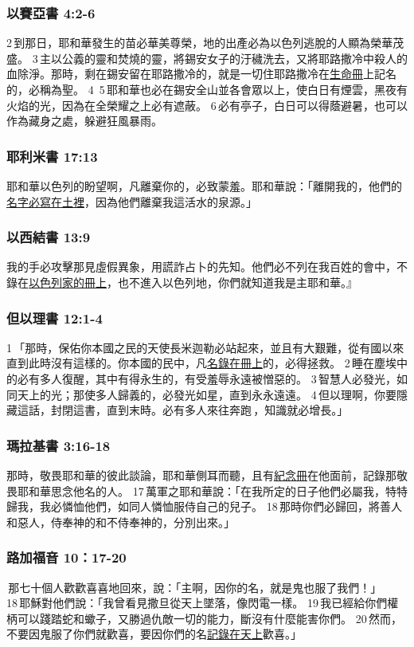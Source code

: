 \subsubsection{以賽亞書 4:2-6}
2 到那日，耶和華發生的苗必華美尊榮，地的出產必為以色列逃脫的人顯為榮華茂盛。 3 主以公義的靈和焚燒的靈，將錫安女子的汙穢洗去，又將耶路撒冷中殺人的血除淨。那時，剩在錫安留在耶路撒冷的，就是一切住耶路撒冷在\underline{生命冊}上記名的，必稱為聖。 4  5 耶和華也必在錫安全山並各會眾以上，使白日有煙雲，黑夜有火焰的光，因為在全榮耀之上必有遮蔽。 6 必有亭子，白日可以得蔭避暑，也可以作為藏身之處，躲避狂風暴雨。


\subsubsection{耶利米書 17:13}
耶和華以色列的盼望啊，凡離棄你的，必致蒙羞。耶和華說：「離開我的，他們的\underline{名字必寫在土裡}，因為他們離棄我這活水的泉源。」

\subsubsection{以西結書 13:9}
我的手必攻擊那見虛假異象，用謊詐占卜的先知。他們必不列在我百姓的會中，不錄在\underline{以色列家的冊上}，也不進入以色列地，你們就知道我是主耶和華。』



\subsubsection{但以理書 12:1-4}
1 「那時，保佑你本國之民的天使長米迦勒必站起來，並且有大艱難，從有國以來直到此時沒有這樣的。你本國的民中，凡\underline{名錄在冊上}的，必得拯救。 2 睡在塵埃中的必有多人復醒，其中有得永生的，有受羞辱永遠被憎惡的。 3 智慧人必發光，如同天上的光；那使多人歸義的，必發光如星，直到永永遠遠。 4 但以理啊，你要隱藏這話，封閉這書，直到末時。必有多人來往奔跑 ，知識就必增長。」

\subsubsection{瑪拉基書 3:16-18}
那時，敬畏耶和華的彼此談論，耶和華側耳而聽，且有\underline{紀念冊}在他面前，記錄那敬畏耶和華思念他名的人。 17 萬軍之耶和華說：「在我所定的日子他們必屬我，特特歸我，我必憐恤他們，如同人憐恤服侍自己的兒子。 18 那時你們必歸回，將善人和惡人，侍奉神的和不侍奉神的，分別出來。」

\subsubsection{路加福音 10：17-20}
 那七十個人歡歡喜喜地回來，說：「主啊，因你的名，就是鬼也服了我們！」 18 耶穌對他們說：「我曾看見撒旦從天上墜落，像閃電一樣。 19 我已經給你們權柄可以踐踏蛇和蠍子，又勝過仇敵一切的能力，斷沒有什麼能害你們。 20 然而，不要因鬼服了你們就歡喜，要因你們的名\underline{記錄在天上}歡喜。」

